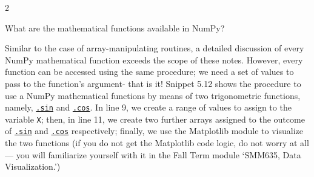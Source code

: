\documentclass[a4paper,11pt]{book}
\newcommand{\question}[1]{%
    \begin{tcolorbox}[colback=comp_c!10,colframe=comp_c,sidebyside align=top,width=\linewidth,before skip=1ex]
        #1
    \end{tcolorbox}
    \switchcolumn%
}
\newcommand{\note}[1]{%
    \begin{tcolorbox}[colback=white!0,colframe=white!10,width=\linewidth,before skip=1ex]
        #1
    \end{tcolorbox}
}
\begin{document}
\begin{paracol}{2}
\question{\raggedright What are the mathematical functions available in NumPy?}
\note{
Similar to the case of array-manipulating routines, a detailed discussion of every NumPy mathematical function exceeds the scope of these notes. However, every function can be accessed using the same procedure; we need a set of values to pass to the function's argument- that is it! Snippet 5.12 shows the procedure to use a NumPy mathematical functions by means of two trigonometric functions, namely, \href{https://numpy.org/doc/stable/reference/generated/numpy.sin.html\#numpy.sin}{\texttt{.sin}} and \href{https://numpy.org/doc/stable/reference/generated/numpy.cos.html\#numpy.cos}{\texttt{.cos}}. In line 9, we create a range of values to assign to the variable \texttt{X}; then, in line 11, we create two further arrays assigned to the outcome of \href{https://numpy.org/doc/stable/reference/generated/numpy.sin.html\#numpy.sin}{\texttt{.sin}} and \href{https://numpy.org/doc/stable/reference/generated/numpy.cos.html\#numpy.cos}{\texttt{.cos}} respectively; finally, we use the Matplotlib module to visualize the two functions (if you do not get the Matplotlib code logic, do not worry at all --- you will familiarize yourself with it in the Fall Term module `SMM635, Data Visualization.')}
\end{paracol}
\end{document}
